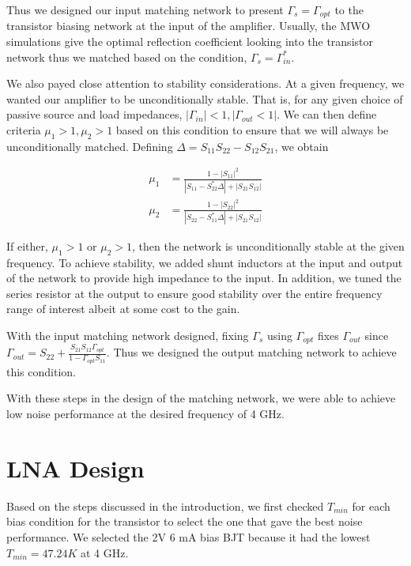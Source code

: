 \documentclass[twocolumn, aps, apl]{revtex4-1}
\begin{document}
Thus we designed our input matching network to present $\Gamma_s = \Gamma_{opt}$ to the transistor biasing network at the input of the amplifier. Usually, the MWO simulations give the optimal reflection coefficient looking into the transistor network thus we matched based on the condition, $\Gamma_s = \Gamma_{in}^*$. 

We also payed close attention to stability considerations. At a given frequency, we wanted our amplifier to be unconditionally stable. That is, for any given choice of passive source and load impedances, $|\Gamma_{in}| < 1, |\Gamma_{out} < 1|$. We can then define criteria $\mu_1 > 1, \mu_2 > 1$ based on this condition to ensure that we will always be unconditionally matched. Defining $\Delta = S_{11}S_{22} - S_{12}S_{21}$, we obtain

\begin{align}
    \mu_1 &= \frac{1 - |S_{11}|^2}{|S_{11} - S_{22}^* \Delta| + |S_{21}S_{12}|} \\
    \mu_2 &= \frac{1 - |S_{22}|^2}{|S_{22} - S_{11}^* \Delta| + |S_{21}S_{12}|}
\end{align}

If either, $\mu_1 > 1$ or $\mu_2 > 1$, then the network is unconditionally stable at the given frequency. To achieve stability, we added shunt inductors at the input and output of the network to provide high impedance to the input. In addition, we tuned the series resistor at the output to ensure good stability over the entire frequency range of interest albeit at some cost to the gain.

With the input matching network designed, fixing $\Gamma_s $ using $ \Gamma_{opt}$ fixes $\Gamma_{out}$ since $\Gamma_{out} = S_{22} + \frac{S_{21}S_{12}\Gamma_{opt}}{1 - \Gamma_{opt} S_{11}}$. Thus we designed the output matching network to achieve this condition. 

With these steps in the design of the matching network, we were able to achieve low noise performance at the desired frequency of 4 GHz.

\section*{LNA Design}\label{sec:design}
Based on the steps discussed in the introduction, we first checked $T_{min}$ for each bias condition for the transistor to select the one that gave the best noise performance. We selected the 2V 6 mA bias BJT because it had the lowest $T_{min} = 47.24 K$ at 4 GHz.
\end{document}
